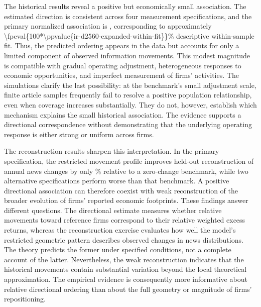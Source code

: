 The historical results reveal a positive but economically small association.
The estimated direction is consistent across four measurement specifications,
and the primary normalized association is ,
corresponding to approximately
\num[round-mode=places,round-precision=2]{\fpeval{100*\ppvalue{ir-d2560-expanded-within-fit}}}\%
descriptive within-sample fit.
Thus, the predicted ordering appears in the data but accounts for only a
limited component of observed information movements.
This modest magnitude is compatible with gradual operating adjustment,
heterogeneous responses to economic opportunities, and imperfect measurement
of firms' activities.
The simulations clarify the last possibility: at the benchmark's small
adjustment scale, finite article samples frequently fail to resolve a
positive population relationship, even when coverage increases substantially.
They do not, however, establish which mechanism explains the small historical
association.
The evidence supports a directional correspondence without demonstrating that
the underlying operating response is either strong or uniform across firms.

The reconstruction results sharpen this interpretation.
In the primary specification, the restricted movement profile improves
held-out reconstruction of annual news changes by only
\% relative to a zero-change
benchmark, while two alternative specifications perform worse than that benchmark.
A positive directional association can therefore coexist with weak
reconstruction of the broader evolution of firms' reported economic footprints.
These findings answer different questions.
The directional estimate measures whether relative movements toward reference
firms correspond to their relative weighted excess returns, whereas the reconstruction
exercise evaluates how well the model's restricted geometric pattern
describes observed changes in news distributions.
The theory predicts the former under specified conditions, not a complete
account of the latter.
Nevertheless, the weak reconstruction indicates that the historical movements
contain substantial variation beyond the local theoretical approximation.
The empirical evidence is consequently more informative about relative
directional ordering than about the full geometry or magnitude of firms' repositioning.


